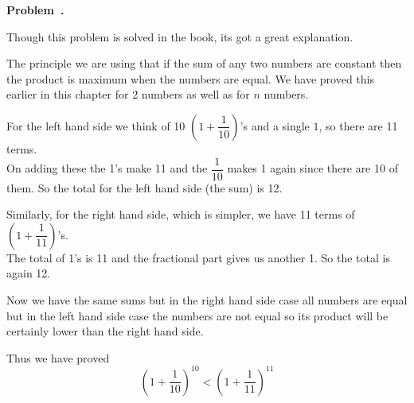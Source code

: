 \documentclass[10pt]{article}
\newcounter{problem}
\newenvironment{problem}[1][]{
  \refstepcounter{problem}
  \par\noindent\textbf{Problem~\theproblem. #1}\par
  \vspace{0.5em}
}{\vspace{1em}}
\begin{document}
\begin{problem} %
Though this problem is solved in the book, its got a great explanation. 

The principle we are using that if the sum of any two numbers are constant then the product is maximum when the numbers are equal. We have 
proved this earlier in this chapter for 2 numbers as well as for $n$ numbers.

For the left hand side we think of 10 $\left(1 + \dfrac{1}{10}\right)$'s and a single $1$, so there are 11 terms.\\

On adding these the 1's make 11 and the $\dfrac{1}{10}$ makes 1 again since there are 10 of them. So the total for the left hand side (the sum) is 12.

Similarly, for the right hand side, which is simpler, we have 11 terms of $\left(1 + \dfrac{1}{11}\right)$'s.\\

The total of 1's is 11 and the fractional part gives us another 1. So the total is again 12.

Now we have the same sums but in the right hand side case all numbers are equal but in the left hand side case the numbers are not equal so its product will be 
certainly lower than the right hand side.

Thus we have proved
\[
\left(1 + \dfrac{1}{10}\right)^{10} < \left(1 + \dfrac{1}{11}\right)^{11}
\]
\end{problem}
\end{document}
